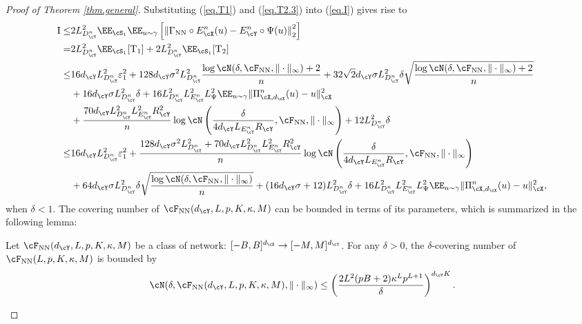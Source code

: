 \documentclass[11pt]{article} %
\begin{document}
\begin{proof}[Proof of Theorem \ref{thm.general}]
Substituting (\ref{eq.T1}) and (\ref{eq.T2.3}) into (\ref{eq.I}) gives rise to
\begin{align}
	{\rm I}\leq&2L_{D^n_{\cY}}^2\EE_{\cS_1}\EE_{u\sim \gamma}\left[\left\| \Gamma_{\rm NN} \circ E_{\cX}^n(u)- E_{\cY}^n\circ\Psi(u)\right\|_{2}^2\right] \nonumber\\
	=&2L_{D^n_{\cY}}^2\EE_{\cS_1}[ {\rm T_1}] + 2L_{D^n_{\cY}}^2\EE_{\cS_1}[ {\rm T_2}] \nonumber\\
	\leq& 16d_{\cY}L_{D^n_{\cY}}^2\varepsilon_1^2+128d_{\cY}\sigma^2L_{D^n_{\cY}}^2\frac{\log \cN(\delta,\cF_{\rm NN}, \|\cdot\|_{\infty}) +2}{n} + 32\sqrt{2}d_{\cY}\sigma L_{D^n_{\cY}}^2\delta \sqrt{\frac{\log \cN(\delta,\cF_{\rm NN}, \|\cdot\|_{\infty}) +2}{n}}\nonumber\\& +16d_{\cY}\sigma L_{D^n_{\cY}}^2 \delta +16L_{D^n_{\cY}}^2 L_{E^n_{\cY}}^2L_{\Psi}^2\EE_{u\sim \gamma}\| \Pi_{\cX,d_{\cX}}^n(u)- u\|_{\cX}^2 \nonumber\\
	& +\frac{70d_{\cY}L_{D^n_{\cY}}^2L_{E^n_{\cY}}^2R_{\cY}^2}{n}\log \cN\left(\frac{\delta}{4d_{\cY}L_{E^n_{\cY}}R_{\cY}},\cF_{\rm NN},\|\cdot\|_{\infty}\right)+12L_{D^n_{\cY}}^2\delta\nonumber \\
	\leq& 16d_{\cY}L_{D^n_{\cY}}^2\varepsilon_1^2+\frac{128d_{\cY}\sigma^2L_{D^n_{\cY}}^2+70d_{\cY}L_{D^n_{\cY}}^2L_{E^n_{\cY}}^2R_{\cY}^2}{n}\log \cN\left(\frac{\delta}{4d_{\cY}L_{E^n_{\cY}}R_{\cY}},\cF_{\rm NN}, \|\cdot\|_{\infty}\right)  \nonumber\\
	& + 64d_{\cY}\sigma L_{D^n_{\cY}}^2\delta \sqrt{\frac{\log \cN(\delta,\cF_{\rm NN}, \|\cdot\|_{\infty}) }{n}} +(16d_{\cY}\sigma+12) L_{D^n_{\cY}}^2 \delta  +16L_{D^n_{\cY}}^2 L_{E^n_{\cY}}^2L_{\Psi}^2\EE_{u\sim \gamma}\| \Pi_{\cX,d_{\cX}}^n(u)- u\|_{\cX}^2,
	\label{eq.I.1}
\end{align}
when $\delta<1$.
The covering number of $\cF_{\rm NN}(d_{\cY},L,p,K,\kappa,M)$ can be bounded in terms of its parameters, which is summarized in the following lemma:
\begin{lemma}\label{lem.covering}
	Let $\cF_{\rm NN}(d_{\cY},L,p,K,\kappa,M)$ be a class of network: $[-B,B]^{d_{\cX}}\rightarrow [-M,M]^{d_{\cY}}$. For any $\delta>0$, the $\delta$-covering number of $\cF_{\rm NN}(L,p,K,\kappa,M)$ is bounded by
	\begin{align}
		\cN(\delta,\cF_{\rm NN}(d_{\cY},L,p,K,\kappa,M),\|\cdot\|_{\infty})\leq \left( \frac{2L^2(pB+2)\kappa^Lp^{L+1}}{\delta}\right)^{d_{\cY}K}.\label{eq.covering}
	\end{align}
\end{lemma}


\end{proof}
\end{document}
